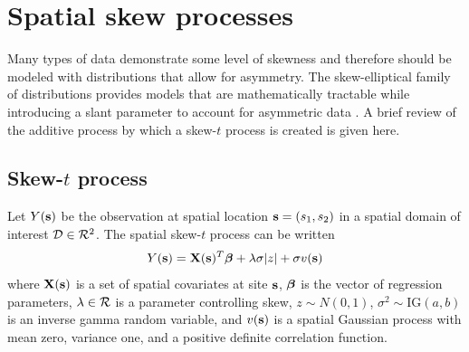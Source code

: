 \documentclass[11pt]{article}
\begin{document}

\section{Spatial skew processes}\label{s:spatialskew}
Many types of data demonstrate some level of skewness and therefore should be modeled with distributions that allow for asymmetry.
The skew-elliptical family of distributions provides models that are mathematically tractable while introducing a slant parameter to account for asymmetric data \citep{Genton2004}.
A brief review of the additive process by which a skew-$t$ process is created is given here.

\subsection{Skew-$t$ process} \label{s:skewt}
Let $Y(\mbox{\bf s})$ be the observation at spatial location $\mbox{\bf s} = (s_1, s_2)$ in a spatial domain of interest ${\cal D} \in {\cal R}^2$.
The spatial skew-$t$ process can be written
\begin{align}
  Y(\mbox{\bf s}) = \mbox{\bf X}(\mbox{\bf s})^T \mbox{\boldmath $\beta$} + \lambda \sigma |z| + \sigma v(\mbox{\bf s})
\end{align}
where $\mbox{\bf X}(\mbox{\bf s})$ is a set of spatial covariates at site $\mbox{\bf s}$, $\mbox{\boldmath $\beta$}$ is the vector of regression parameters, $\lambda \in {\cal R}$ is a parameter controlling skew, $z \sim N(0, 1)$, $\sigma^2 \sim \text{IG}(a, b)$ is an inverse gamma random variable, and $v(\mbox{\bf s})$ is a spatial Gaussian process with mean zero, variance one, and a positive definite correlation function.
\end{document}

